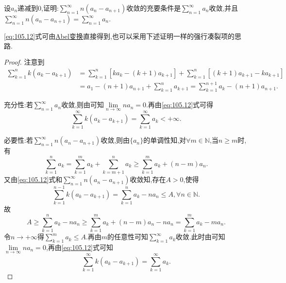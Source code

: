 \documentclass[../../main.tex]{subfiles}
\begin{document}
\begin{proposition}\label{proposition:级数经典命题1}
设$a_n$递减到$0$,证明:$\sum\limits_{n=1}^\infty n\left(a_n-a_{n+1}\right)$收敛的充要条件是$\sum\limits_{n=1}^\infty a_n$收敛,并且$\sum\limits_{n=1}^\infty n\left(a_n-a_{n+1}\right)=\sum\limits_{n=1}^\infty a_n$.
\end{proposition}
\begin{note}
\eqref{eq:105.12}式可由\hyperref[theorem:Abel变换]{Abel变换}直接得到,也可以采用下述证明一样的强行凑裂项的思路.
\end{note}
\begin{proof}
注意到
\begin{align}
\sum_{k=1}^n{k\left( a_k-a_{k+1} \right)}&=\sum_{k=1}^n{\left[ ka_k-\left( k+1 \right) a_{k+1} \right]}+\sum_{k=1}^n{\left[ \left( k+1 \right) a_{k+1}-ka_{k+1} \right]} \nonumber \\
&=a_1-\left( n+1 \right) a_{n+1}+\sum_{k=1}^n{a_{k+1}}=\sum_{k=1}^{n+1}{a_k}-\left( n+1 \right) a_{n+1}. \label{eq:105.12}
\end{align}

{\heiti 充分性:}若$\sum_{n=1}^{\infty}{a_n}$收敛,则由可知$\lim\limits_{n\rightarrow \infty}na_n=0$.再由\eqref{eq:105.12}式可得
$$\sum_{k=1}^{\infty}{k\left( a_k-a_{k+1} \right)}=\sum_{k=1}^{\infty}{a_k}<+\infty .$$

{\heiti 必要性:}若$\sum_{n=1}^{\infty}{n\left( a_n-a_{n+1} \right)}$收敛,则由$\{ a_n \}$的单调性知,对$\forall m\in \mathbb{N}$,当$n\geqslant m$时,有
$$\sum_{k=1}^n{a_k}=\sum_{k=1}^m{a_k}+\sum_{k=m+1}^n{a_k}\geqslant \sum_{k=1}^m{a_k}+\left( n-m \right) a_n.$$
又由\eqref{eq:105.12}式和$\sum_{n=1}^{\infty}{n\left( a_n-a_{n+1} \right)}$收敛知,存在$A>0$,使得
$$\sum_{k=1}^{n-1}{k\left( a_k-a_{k+1} \right)}=\sum_{k=1}^n{a_k}-na_n\leqslant A,\forall n\in \mathbb{N} .$$
故
$$A\geqslant \sum_{k=1}^n{a_k}-na_n\geqslant \sum_{k=1}^m{a_k}+\left( n-m \right) a_n-na_n=\sum_{k=1}^m{a_k}-ma_n.$$
令$n\rightarrow +\infty$得$\sum_{k=1}^m{a_k}\leqslant A$.再由$m$的任意性可知$\sum_{k=1}^{\infty}{a_k}$收敛.此时由可知$\lim\limits_{n\rightarrow \infty}na_n=0$,再由\eqref{eq:105.12}式可知
$$\sum_{k=1}^{\infty}{k\left( a_k-a_{k+1} \right)}=\sum_{k=1}^{\infty}{a_k}.$$
\end{proof}
\end{document}
